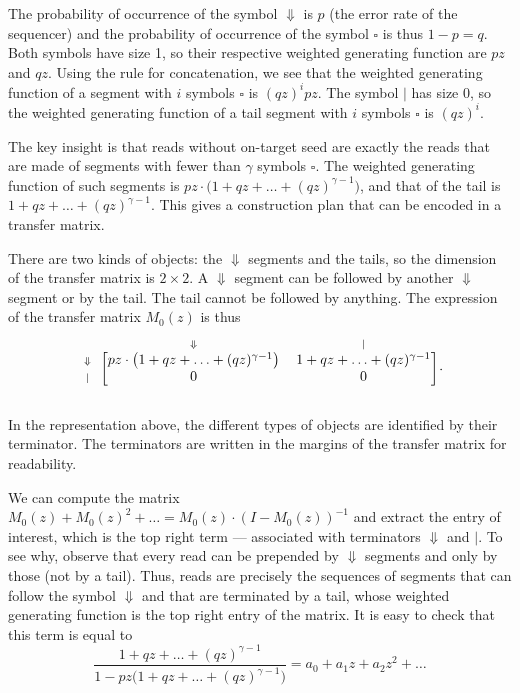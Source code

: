 \documentclass{article}
\begin{document}
The probability of occurrence of the symbol $\Downarrow$ is $p$ (the error
rate of the sequencer) and the probability of occurrence of the symbol
$\square$ is thus $1-p = q$. Both symbols have size 1, so their respective
weighted generating function are $pz$ and $qz$. Using the rule for
concatenation, we see that the weighted generating function of a segment
with $i$ symbols $\square$ is $(qz)^ipz$. The symbol $|$ has size 0, so
the weighted generating function of a tail segment with $i$ symbols
$\square$ is $(qz)^i$.

The key insight is that reads without on-target seed are exactly the reads
that are made of segments with fewer than $\gamma$ symbols $\square$. The
weighted generating function of such segments is $pz \cdot \big(
1+qz+\ldots+(qz)^{\gamma-1} \big)$, and that of the tail is
$1+qz+\ldots+(qz)^{\gamma-1}$. This gives a construction plan that can be
encoded in a transfer matrix.

There are two kinds of objects: the $\Downarrow$ segments and the tails,
so the dimension of the transfer matrix is $2 \times 2$. A $\Downarrow$
segment can be followed by another $\Downarrow$ segment or by the tail.
The tail cannot be followed by anything. The expression of the transfer
matrix $M_0(z)$ is thus
\begin{equation*}
\begin{blockarray}{ccc}
   & \scriptstyle{\Downarrow} & \scriptstyle{|} \\
\begin{block}{c[cc]}
\scriptstyle{\Downarrow} & pz \cdot \big( 1+qz+\ldots+(qz)^{\gamma-1}
\big)  & 1+qz+\ldots+(qz)^{\gamma-1} \\
\scriptstyle{|} & 0 & 0 \\
\end{block}
\end{blockarray}.
\end{equation*}

In the representation above, the different types of objects are identified
by their terminator. The terminators are written in the margins of the
transfer matrix for readability.

We can compute the matrix $M_0(z) + M_0(z)^2 + \ldots = M_0(z) \cdot
(I-M_0(z))^{-1}$ and extract the entry of interest, which is the top right
term --- associated with terminators $\Downarrow$ and $|$. To see why,
observe that every read can be prepended by $\Downarrow$ segments and only
by those (not by a tail). Thus, reads are precisely the sequences of
segments that can follow the symbol $\Downarrow$ and that are terminated
by a tail, whose weighted generating function is the top right entry of
the matrix. It is easy to check that this term is equal to
\begin{equation}
\label{eq:F}
\frac{1+qz+\ldots+(qz)^{\gamma-1}}
  {1-pz \big(1+qz+\ldots+(qz)^{\gamma-1} \big)} = a_0 + a_1z + a_2z^2 +
\ldots
\end{equation}
\end{document}
